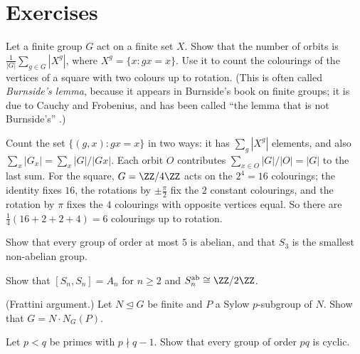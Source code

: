 \section{Exercises}\label{groups:section-exercises}

\begin{exercise}\label{groups:exercise-burnside-lemma}
Let a finite group $G$ act on a finite set $X$. Show that the number of orbits is
$\frac{1}{|G|}\sum_{g \in G} |X^g|$, where $X^g = \{x : gx = x\}$. Use it to count the colourings of the vertices of a square with two colours up to rotation.
(This is often called \emph{Burnside's lemma}, because it appears in Burnside's book on finite groups; it is due to Cauchy and Frobenius, and has been called ``the lemma that is not
Burnside's'' \cite{neumann-1979}.)
\end{exercise}

\begin{solution}
Count the set $\{(g, x) : gx = x\}$ in two ways: it has $\sum_g |X^g|$ elements, and
also $\sum_x |G_x| = \sum_x |G|/|Gx|$. Each orbit $O$ contributes
$\sum_{x \in O} |G|/|O| = |G|$ to the last sum. For the square, $G = \ZZ/4\ZZ$ acts on the $2^4 = 16$ colourings; the identity fixes $16$, the rotations by $\pm\frac\pi2$ fix the $2$ constant
colourings, and the rotation by $\pi$ fixes the $4$ colourings with opposite vertices equal. So there are $\frac14(16 + 2 + 2 + 4) = 6$ colourings up to rotation.
\end{solution}

\begin{exercise}\label{groups:exercise-small-orders}
Show that every group of order at most $5$ is abelian, and that $S_3$ is the smallest
non-abelian group.
\end{exercise}

\begin{exercise}\label{groups:exercise-abelianization-symmetric}
Show that $[S_n, S_n] = A_n$ for $n \geq 2$ and $S_n^{\mathrm{ab}} \cong \ZZ/2\ZZ$.
\end{exercise}

\begin{exercise}\label{groups:exercise-frattini}
(Frattini argument.) Let $N \trianglelefteq G$ be finite and $P$ a Sylow $p$-subgroup of $N$.
Show that $G = N \cdot N_G(P)$.
\end{exercise}

\begin{exercise}\label{groups:exercise-order-pq}
Let $p < q$ be primes with $p \nmid q - 1$. Show that every group of order $pq$ is cyclic.
\end{exercise}

